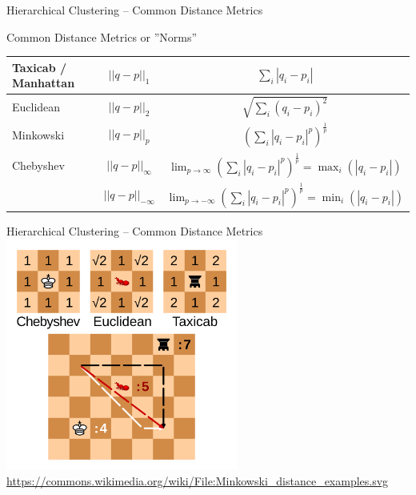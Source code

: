 \documentclass[ignorenonframetext,xcolor=x11names]{beamer}
\begin{document}
\begin{frame}{Hierarchical Clustering -- Common Distance Metrics}
\begin{block}{Common Distance Metrics or ''Norms''}
\renewcommand{\arraystretch}{2}
\centering 
\footnotesize
\begin{tabular}{l|c|c} \hline
\begin{minipage}{1.75cm}Taxicab / Manhattan\end{minipage} & $ ||q-p||_1 $ & $\displaystyle \sum_i | q_i - p_i |$ \\ \hline
Euclidean & $ ||q-p||_2$ & $\displaystyle \sqrt{ \sum_i (q_i-p_i)^2}$ \\ \hline
Minkowski & $||q-p||_p$ & $\displaystyle \left( \sum_i | q_i - p_i |^p \right)^{\frac{1}{p}}$ \\ \hline
Chebyshev & $||q-p||_\infty$ & $\displaystyle \lim_{p \rightarrow \infty} \left( \sum_i | q_i - p_i |^p \right)^{\frac{1}{p}} = \max_i( | q_i - p_i | )$ \\ \hline
  & $||q-p||_{-\infty}$ & $\displaystyle \lim_{p \rightarrow -\infty} \left( \sum_i | q_i - p_i |^p \right)^{\frac{1}{p}} = \min_i( | q_i - p_i | )$ \\ \hline
\end{tabular}
\end{block}
\end{frame}

\begin{frame}{Hierarchical Clustering -- Common Distance Metrics}
\centering
\includegraphics[height=3in]{Minkowski_distance_examples.svg.png} \\

\scriptsize \url{https://commons.wikimedia.org/wiki/File:Minkowski_distance_examples.svg}
\end{frame}
\end{document}
